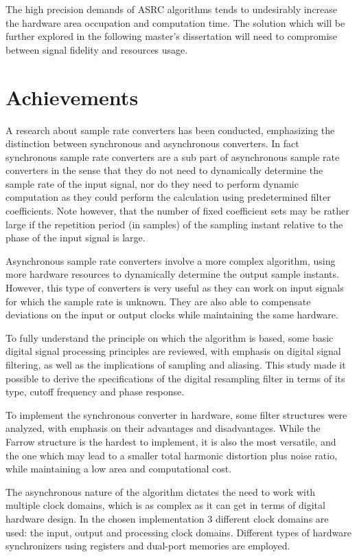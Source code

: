 The high precision demands of ASRC algorithms tends to undesirably increase the
hardware area occupation and computation time. The solution which will be further
explored in the following master's dissertation will need to compromise between
signal fidelity and resources usage.

\section{Achievements}
\label{section:achievements}

A research about sample rate converters has been conducted, emphasizing the
distinction between synchronous and asynchronous converters. In fact synchronous
sample rate converters are a sub part of asynchronous sample rate converters in
the sense that they do not need to dynamically determine the sample rate of the
input signal, nor do they need to perform dynamic computation as they could
perform the calculation using predetermined filter coefficients. Note however,
that the number of fixed coefficient sets may be rather large if the repetition
period (in samples) of the sampling instant relative to the phase of the input
signal is large.

Asynchronous sample rate converters involve a more complex algorithm, using more
hardware resources to dynamically determine the output sample instants. However,
this type of converters is very useful as they can work on input signals for
which the sample rate is unknown. They are also able to compensate deviations on
the input or output clocks while maintaining the same hardware.

To fully understand the principle on which the algorithm is based, some basic
digital signal processing principles are reviewed, with emphasis on digital
signal filtering, as well as the implications of sampling and aliasing. This
study made it possible to derive the specifications of the digital resampling
filter in terms of its type, cutoff frequency and phase response.

To implement the synchronous converter in hardware, some filter structures were
analyzed, with emphasis on their advantages and disadvantages. While the Farrow
structure is the hardest to implement, it is also the most versatile, and the
one which may lead to a smaller total harmonic distortion plus noise ratio,
while maintaining a low area and computational cost.

The asynchronous nature of the algorithm dictates the need to work with multiple
clock domains, which is as complex as it can get in terms of digital hardware
design. In the chosen implementation 3 different clock domains are used: the
input, output and processing clock domains. Different types of hardware
synchronizers using registers and dual-port memories are employed.


